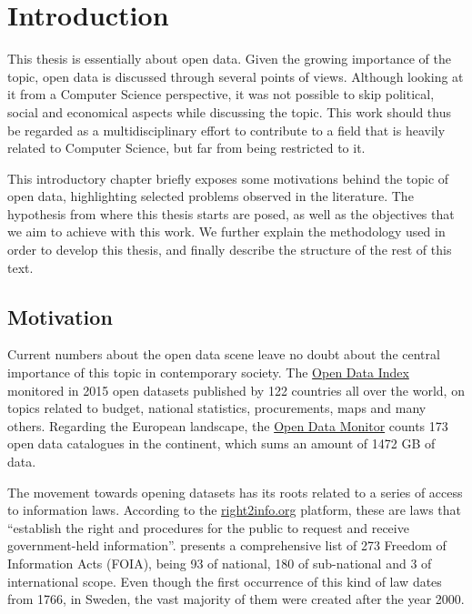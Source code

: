 \chapter{Introduction}

This thesis is essentially about open data.
Given the growing importance of the topic, open data is discussed through several points of views.
Although looking at it from a Computer Science perspective, it was not possible to skip political, social and economical aspects while discussing the topic.
This work should thus be regarded as a multidisciplinary effort to contribute to a field that is heavily related to Computer Science, but far from being restricted to it.

This introductory chapter briefly exposes some motivations behind the topic of open data, highlighting selected problems observed in the literature.
The hypothesis from where this thesis starts are posed, as well as the objectives that we aim to achieve with this work.
We further explain the methodology used in order to develop this thesis, and finally describe the structure of the rest of this text.

\section{Motivation}
Current numbers about the open data scene leave no doubt about the central importance of this topic in contemporary society.
The \href{http://index.okfn.org/place/}{Open Data Index} monitored in 2015 open datasets published by 122 countries all over the world, on topics related to budget, national statistics, procurements, maps and many others.
Regarding the European landscape, the \href{http://opendatamonitor.eu/}{Open Data Monitor} counts 173 open data catalogues in the continent, which sums an amount of 1472 GB of data.

The movement towards opening datasets has its roots related to a series of access to information laws. 
According to the \href{http://right2info.org}{right2info.org} platform, these are laws that ``establish the right and procedures for the public to request and receive government-held information''.
 presents a comprehensive list of 273 Freedom of Information Acts (FOIA), being 93 of national, 180 of sub-national and 3 of international scope.
Even though the first occurrence of this kind of law dates from 1766, in Sweden, the vast majority of them were created after the year 2000.


